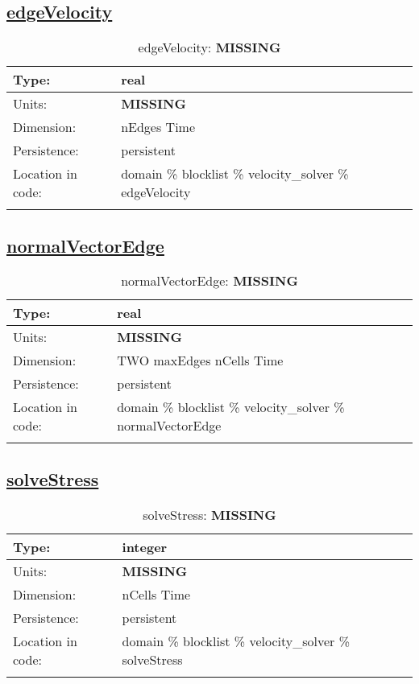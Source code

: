 \subsection[edgeVelocity]{\hyperref[sec:var_tab_velocity_solver]{edgeVelocity}}
\label{subsec:var_sec_velocity_solver_edgeVelocity}
\begin{center}
\begin{longtable}{| p{2.0in} | p{4.0in} |}
        \hline 
        Type: & real \\
        \hline 
        Units: & {\bf \color{red} MISSING} \\
        \hline 
        Dimension: & nEdges Time \\
        \hline 
        Persistence: & persistent \\
        \hline 
         Location in code: & domain \% blocklist \% velocity\_solver \% edgeVelocity \\
         \hline 
    \caption{edgeVelocity: {\bf \color{red} MISSING}}
\end{longtable}
\end{center}
\subsection[normalVectorEdge]{\hyperref[sec:var_tab_velocity_solver]{normalVectorEdge}}
\label{subsec:var_sec_velocity_solver_normalVectorEdge}
\begin{center}
\begin{longtable}{| p{2.0in} | p{4.0in} |}
        \hline 
        Type: & real \\
        \hline 
        Units: & {\bf \color{red} MISSING} \\
        \hline 
        Dimension: & TWO maxEdges nCells Time \\
        \hline 
        Persistence: & persistent \\
        \hline 
         Location in code: & domain \% blocklist \% velocity\_solver \% normalVectorEdge \\
         \hline 
    \caption{normalVectorEdge: {\bf \color{red} MISSING}}
\end{longtable}
\end{center}
\subsection[solveStress]{\hyperref[sec:var_tab_velocity_solver]{solveStress}}
\label{subsec:var_sec_velocity_solver_solveStress}
\begin{center}
\begin{longtable}{| p{2.0in} | p{4.0in} |}
        \hline 
        Type: & integer \\
        \hline 
        Units: & {\bf \color{red} MISSING} \\
        \hline 
        Dimension: & nCells Time \\
        \hline 
        Persistence: & persistent \\
        \hline 
         Location in code: & domain \% blocklist \% velocity\_solver \% solveStress \\
         \hline 
    \caption{solveStress: {\bf \color{red} MISSING}}
\end{longtable}
\end{center}
